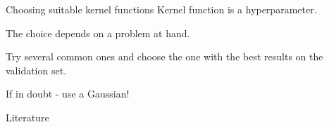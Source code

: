 \documentclass[dvipsnames]{beamer}
\begin{document}
			\begin{frame}{Choosing suitable kernel functions}
				Kernel function is a hyperparameter. %
				
				The choice depends on a problem at hand. %
				
				Try several common ones and choose the one with the best results on the validation set. %
				
				If in doubt - use a Gaussian!
			\end{frame}
			
			 \begin{frame}{Literature}
    \printbibliography
  \end{frame}
			
\end{document}
